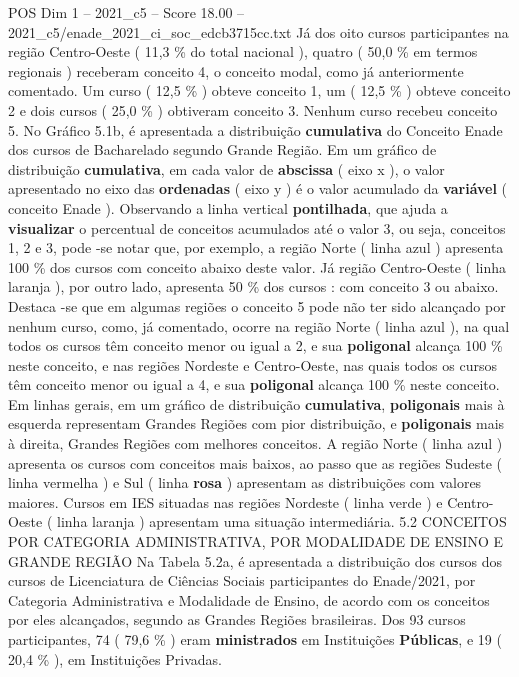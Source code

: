 \begin{textsample}{POS Dim 1 – 2021\_c5 – Score 18.00 – 2021\_c5/enade\_2021\_ci\_soc\_edcb3715cc.txt}
Já dos oito cursos participantes na região Centro-Oeste ( 11,3 \% do total nacional ), quatro ( 50,0 \% em termos regionais ) receberam conceito 4, o conceito modal, como já anteriormente comentado.
Um curso ( 12,5 \% ) obteve conceito 1, um ( 12,5 \% ) obteve conceito 2 e dois cursos ( 25,0 \% ) obtiveram conceito 3.
Nenhum curso recebeu conceito 5.
No Gráfico 5.1b, é apresentada a distribuição \textbf{cumulativa} do Conceito Enade dos cursos de Bacharelado segundo Grande Região.
Em um gráfico de distribuição \textbf{cumulativa}, em cada valor de \textbf{abscissa} ( eixo x ), o valor apresentado no eixo das \textbf{ordenadas} ( eixo y ) é o valor acumulado da \textbf{variável} ( conceito Enade ).
Observando a linha vertical \textbf{pontilhada}, que ajuda a \textbf{visualizar} o percentual de conceitos acumulados até o valor 3, ou seja, conceitos 1, 2 e 3, pode -se notar que, por exemplo, a região Norte ( linha azul ) apresenta 100 \% dos cursos com conceito abaixo deste valor.
Já região Centro-Oeste ( linha laranja ), por outro lado, apresenta 50 \% dos cursos : com conceito 3 ou abaixo.
Destaca -se que em algumas regiões o conceito 5 pode não ter sido alcançado por nenhum curso, como, já comentado, ocorre na região Norte ( linha azul ), na qual todos os cursos têm conceito menor ou igual a 2, e sua \textbf{poligonal} alcança 100 \% neste conceito, e nas regiões Nordeste e Centro-Oeste, nas quais todos os cursos têm conceito menor ou igual a 4, e sua \textbf{poligonal} alcança 100 \% neste conceito.
Em linhas gerais, em um gráfico de distribuição \textbf{cumulativa}, \textbf{poligonais} mais à esquerda representam Grandes Regiões com pior distribuição, e \textbf{poligonais} mais à direita, Grandes Regiões com melhores conceitos.
A região Norte ( linha azul ) apresenta os cursos com conceitos mais baixos, ao passo que as regiões Sudeste ( linha vermelha ) e Sul ( linha \textbf{rosa} ) apresentam as distribuições com valores maiores.
Cursos em IES situadas nas regiões Nordeste ( linha verde ) e Centro-Oeste ( linha laranja ) apresentam uma situação intermediária. 5.2 CONCEITOS POR CATEGORIA ADMINISTRATIVA, POR MODALIDADE DE ENSINO E GRANDE REGIÃO Na Tabela 5.2a, é apresentada a distribuição dos cursos dos cursos de Licenciatura de Ciências Sociais participantes do Enade/2021, por Categoria Administrativa e Modalidade de Ensino, de acordo com os conceitos por eles alcançados, segundo as Grandes Regiões brasileiras.
Dos 93 cursos participantes, 74 ( 79,6 \% ) eram \textbf{ministrados} em Instituições \textbf{Públicas}, e 19 ( 20,4 \% ), em Instituições Privadas.

\end{textsample}

